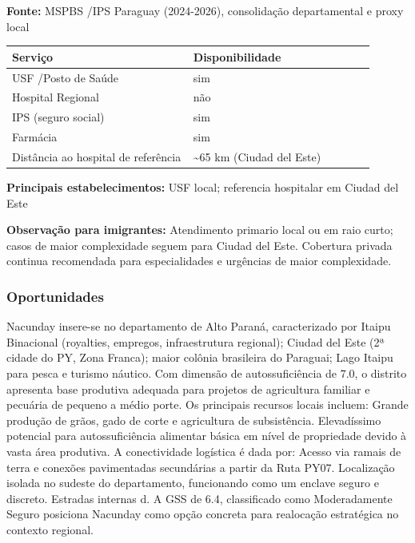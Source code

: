 \textbf{Fonte:} MSPBS /\allowbreak  IPS Paraguay (2024-2026), consolidação
departamental e proxy local

{\def\LTcaptype{none} %
\begin{longtable}{@{}>{\raggedright\arraybackslash}p{0.45\linewidth} >{\raggedright\arraybackslash}p{0.45\linewidth}@{}}
\toprule\noalign{}
Serviço & Disponibilidade \\
\midrule\noalign{}
\endhead
\bottomrule\noalign{}
\endlastfoot
USF /\allowbreak  Posto de Saúde & sim \\
Hospital Regional & não \\
IPS (seguro social) & sim \\
Farmácia & sim \\
Distância ao hospital de referência & \textasciitilde65 km (Ciudad del
Este) \\
\end{longtable}
}

\textbf{Principais estabelecimentos:} USF local; referencia hospitalar
em Ciudad del Este

\textbf{Observação para imigrantes:} Atendimento primario local ou em
raio curto; casos de maior complexidade seguem para Ciudad del Este.
Cobertura privada continua recomendada para especialidades e urgências
de maior complexidade.
\newpage

\subsubsection*{Oportunidades}\label{oport-nacunday-1008}
Nacunday insere-se no departamento de Alto Paraná, caracterizado por Itaipu Binacional (royalties, empregos, infraestrutura regional); Ciudad del Este (2ª cidade do PY, Zona Franca); maior colônia brasileira do Paraguai; Lago Itaipu para pesca e turismo náutico. Com dimensão de autossuficiência de 7.0, o distrito apresenta base produtiva adequada para projetos de agricultura familiar e pecuária de pequeno a médio porte. Os principais recursos locais incluem: Grande produção de grãos, gado de corte e agricultura de subsistência. Elevadíssimo potencial para autossuficiência alimentar básica em nível de propriedade devido à vasta área produtiva. A conectividade logística é dada por: Acesso via ramais de terra e conexões pavimentadas secundárias a partir da Ruta PY07. Localização isolada no sudeste do departamento, funcionando como um enclave seguro e discreto. Estradas internas d. A GSS de 6.4, classificado como Moderadamente Seguro posiciona Nacunday como opção concreta para realocação estratégica no contexto regional.

